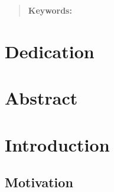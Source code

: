 \documentclass[12pt]{report} %
\begin{document}
\renewcommand\abstractname{\large\uppercase{Summary}}
\begin{abstract}
\thispagestyle{plain}
\setcounter{page}{3}
	
	
	\textbf{Keywords:}
	
	\vfill
\end{abstract}
	\newpage
	\thispagestyle{empty}
	\mbox{}


\chapter*{Dedication}

\setcounter{page}{5}
	
		
	\vfill
	
	\newpage
	\thispagestyle{empty}
	\mbox{}
	
\chapter*{Abstract}

\setcounter{page}{5}
	
		
	\vfill
	
	\newpage
	\thispagestyle{empty}
	\mbox{}
	


\tableofcontents
\thispagestyle{fancy}

\newpage
\thispagestyle{empty}
\mbox{}

\listoffigures
\thispagestyle{fancy}

\newpage
\thispagestyle{empty}
\mbox{}

\listoftables
\thispagestyle{fancy}

\newpage %
\thispagestyle{empty}
\mbox{}


\clearpage
{}

\chapter{Introduction}
\section{Motivation} \label{section:motivation}
\end{document}
